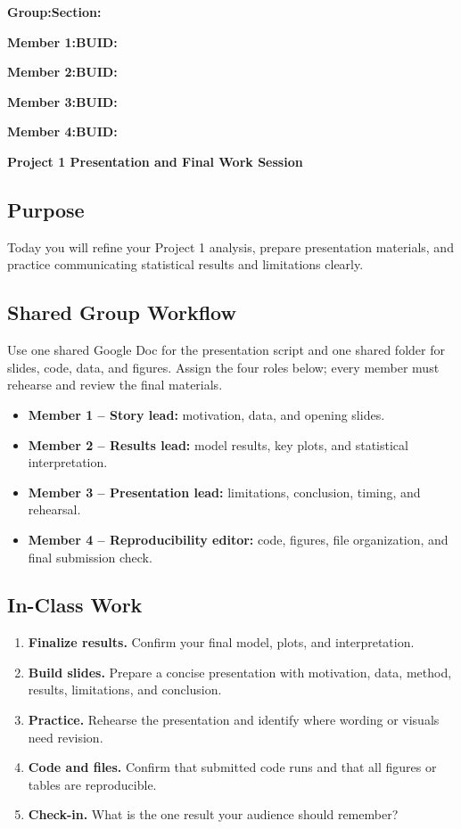 \documentclass{article}
\newcommand{\projecttitle}{Project 1 Presentation and Final Work Session}
\newcommand{\blankline}{\underline{\phantom{XXXXXXXXXXXXXXXXXXXXXXXX}}}
\newcommand{\blankid}{\underline{\phantom{XXXXXXXXXXXXXXX}}}
\begin{document}
\noindent\textbf{Group:}\blankline{}\hfill\textbf{Section:}\blankid{}

\medskip
\noindent\textbf{Member 1:}\blankline{}\hfill\textbf{BUID:}\blankid{}

\medskip
\noindent\textbf{Member 2:}\blankline{}\hfill\textbf{BUID:}\blankid{}

\medskip
\noindent\textbf{Member 3:}\blankline{}\hfill\textbf{BUID:}\blankid{}

\medskip
\noindent\textbf{Member 4:}\blankline{}\hfill\textbf{BUID:}\blankid{}

\begin{center}
  {\Large \textbf{\projecttitle{}}}
\end{center}

\subsection*{Purpose}
Today you will refine your Project 1 analysis, prepare presentation materials, and practice communicating statistical results and limitations clearly.

\subsection*{Shared Group Workflow}
Use one shared Google Doc for the presentation script and one shared folder for slides, code, data, and figures. Assign the four roles below; every member must rehearse and review the final materials.
\begin{itemize}[itemsep=.25em]
  \item \textbf{Member 1 -- Story lead:} motivation, data, and opening slides.
  \item \textbf{Member 2 -- Results lead:} model results, key plots, and statistical interpretation.
  \item \textbf{Member 3 -- Presentation lead:} limitations, conclusion, timing, and rehearsal.
  \item \textbf{Member 4 -- Reproducibility editor:} code, figures, file organization, and final submission check.
\end{itemize}

\subsection*{In-Class Work}
\begin{enumerate}[label={\bfseries (\Alph*)},itemsep=.5em]
  \item \textbf{Finalize results.} Confirm your final model, plots, and interpretation.
  \item \textbf{Build slides.} Prepare a concise presentation with motivation, data, method, results, limitations, and conclusion.
  \item \textbf{Practice.} Rehearse the presentation and identify where wording or visuals need revision.
  \item \textbf{Code and files.} Confirm that submitted code runs and that all figures or tables are reproducible.
  \item \textbf{Check-in.} What is the one result your audience should remember?
\end{enumerate}
\end{document}

